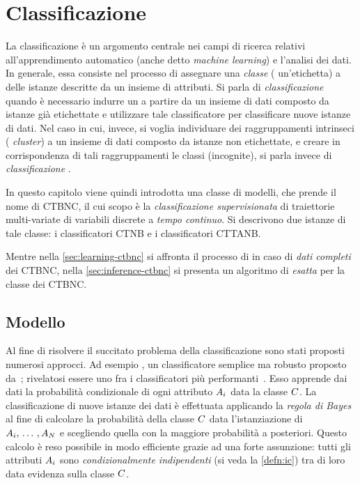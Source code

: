 
\chapter{Classificazione}
\label{cap:ctbnc}
La classificazione è un argomento centrale nei campi di ricerca relativi all'apprendimento automatico (anche detto \emph{machine learning}) e l'analisi dei dati. In generale, essa consiste nel processo di assegnare una \emph{classe} (\ie{} un'etichetta) a delle istanze descritte da un insieme di attributi. Si parla di \emph{classificazione } quando è necessario indurre un  a partire da un insieme di dati composto da istanze già etichettate e utilizzare tale classificatore per classificare nuove istanze di dati. Nel caso in cui, invece, si voglia individuare dei raggruppamenti intrinseci (\ie{} \emph{cluster}) a un insieme di dati composto da istanze non etichettate, e creare in corrispondenza di tali raggruppamenti le classi (incognite), si parla invece di \emph{classificazione }.

In questo capitolo viene quindi introdotta una classe di modelli, che prende il nome di \acf{CTBNC}, il cui scopo è la \emph{classificazione supervisionata} di traiettorie multi-variate di variabili discrete a \emph{tempo continuo}. Si descrivono due istanze di tale classe: i classificatori \acf{CTNB} e i classificatori \acf{CTTANB}.

Mentre nella \autoref{sec:learning-ctbnc} si affronta il processo di \emph{} in caso di \emph{dati completi} dei \acs{CTBNC}, nella \autoref{sec:inference-ctbnc} si presenta un algoritmo di \emph{ esatta} per la classe dei \acs{CTBNC}.

\section{Modello}\label{sec:ctbnc-model}
Al fine di risolvere il succitato problema della classificazione sono stati proposti numerosi approcci. Ad esempio \lwcase \nb{} \class{}, un classificatore semplice ma robusto proposto da~\citet{DudaHart1973}; rivelatosi essere uno fra i classificatori più performanti~\citep{Langley1992}. Esso apprende dai dati la probabilità condizionale di ogni attributo $\mathnormal{A}_i$ data la classe $\mathnormal{C}$. La classificazione di nuove istanze dei dati è effettuata applicando la \emph{regola di Bayes} al fine di calcolare la probabilità della classe $\mathnormal{C}$ data l'istanziazione di $\mathnormal{A}_i,\,\dotsc\,,\mathnormal{A}_N$ e scegliendo quella con la maggiore probabilità a posteriori. Questo calcolo è reso possibile in modo efficiente grazie ad una forte assunzione: tutti gli attributi $\mathnormal{A}_i$ sono \emph{condizionalmente indipendenti} (si veda la \autoref{defn:ic}) tra di loro data evidenza sulla classe $\mathnormal{C}$.

